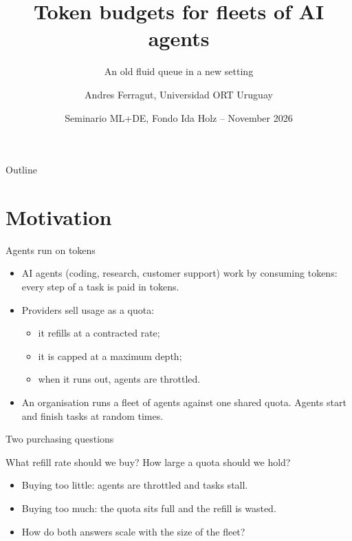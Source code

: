 \documentclass[aspectratio=169]{beamer}
\title{Token budgets for fleets of AI agents}
\subtitle{An old fluid queue in a new setting}
\author[Andres Ferragut, Universidad ORT Uruguay]{Andres Ferragut, Universidad ORT Uruguay}
\institute{joint work with Diego Goldsztajn and Fernando Paganini}
\date[Seminario ML+DE, Fondo Ida Holz -- November 2026]{Seminario ML+DE, Fondo Ida Holz -- November 2026}
\newenvironment*{myitem}[1][1.5em]{\begin{itemize}\setlength{\itemsep}{#1}}{\end{itemize}}
\begin{document}
\frame[plain]{\titlepage}

\begin{frame}{Outline}
\tableofcontents
\end{frame}

\section{Motivation}

\begin{frame}{Agents run on tokens}

	\begin{myitem}
		\item AI agents (coding, research, customer support) work by \alert{consuming tokens}: every step of a task is paid in tokens.
		\item Providers sell usage as a \alert{quota}:
		\begin{itemize}
			\item it refills at a contracted \alert{rate};
			\item it is capped at a maximum \alert{depth};
			\item when it runs out, agents are \alert{throttled}.
		\end{itemize}
		\item An organisation runs a \alert{fleet} of agents against one shared quota. Agents start and finish tasks at random times.
	\end{myitem}
\end{frame}

\begin{frame}{Two purchasing questions}

	\begin{block}{}
		\begin{center}
		What \alert{refill rate} should we buy? \qquad How large a \alert{quota} should we hold?
		\end{center}
	\end{block}

	\medskip

	\begin{myitem}
		\item Buying too little: agents are \alert{throttled} and tasks stall.
		\item Buying too much: the quota sits full and the refill is \alert{wasted}.
		\item How do both answers \alert{scale} with the size of the fleet?
	\end{myitem}
\end{frame}
\end{document}
